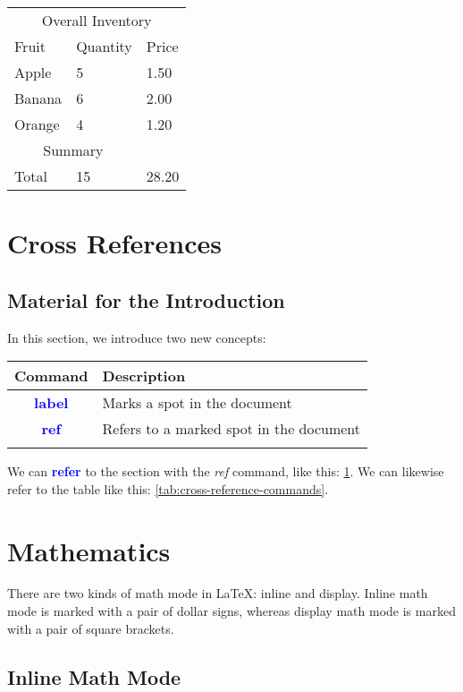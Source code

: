 \documentclass{article}
\newcommand{\kw}[1]{\textcolor{blue}{\textbf{#1}}}
\newcommand{\cmd}[1]{\textit{#1}}
\begin{document}
\begin{tabular}{*{3}{l}}
  \toprule
  \multicolumn{3}{c}{Overall Inventory} \\
  Fruit  & Quantity &  Price  \\
  \midrule
  Apple  & 5        &  1.50   \\
  Banana & 6        &  2.00   \\
  Orange & 4        &  1.20   \\
  \midrule
  \multicolumn{2}{c}{Summary} \\
  Total & 15        & 28.20   \\
  \bottomrule
\end{tabular}

\section{Cross References}
\label{sec:cross-references}

\subsection{Material for the Introduction}

In this section, we introduce two new concepts:

\begin{tabular}{cp{9cm}}
  Command & Description \\
  \toprule
  \kw{label} & Marks a spot in the document \\
  \kw{ref} & Refers to a marked spot in the document \\
  \bottomrule
\label{tab:cross-reference-commands}
\end{tabular}

We can \kw{refer} to the section with the \cmd{ref} command, like this: \ref{sec:cross-references}.
We can likewise refer to the table like this: \ref{tab:cross-reference-commands}.

\section{Mathematics}

There are two kinds of math mode in LaTeX: inline and display. Inline math mode is marked with
a pair of dollar signs, whereas display math mode is marked with a pair of square brackets.

\subsection{Inline Math Mode}
\end{document}

